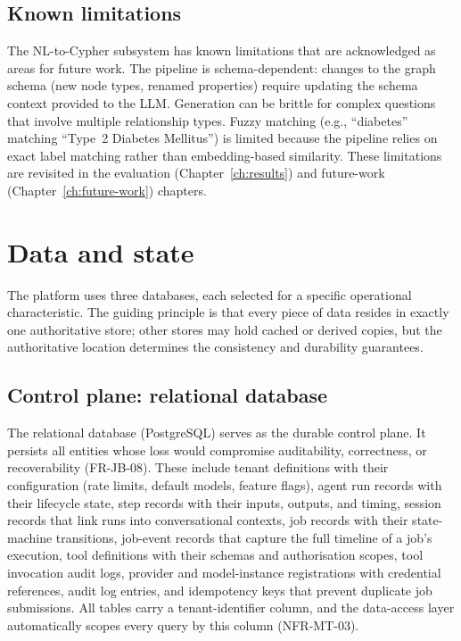 \documentclass[a4paper]{sapthesis}
\begin{document}
\subsection{Known limitations}

The NL-to-Cypher subsystem has known limitations that are acknowledged as
areas for future work.  The pipeline is schema-dependent: changes to the
graph schema (new node types, renamed properties) require updating the
schema context provided to the LLM.  Generation can be brittle for complex
questions that involve multiple relationship types.  Fuzzy matching (e.g.,
``diabetes'' matching ``Type~2 Diabetes Mellitus'') is limited because the
pipeline relies on exact label matching rather than embedding-based
similarity.  These limitations are revisited in the evaluation
(Chapter~\ref{ch:results}) and future-work (Chapter~\ref{ch:future-work})
chapters.


\section{Data and state}
\label{sec:data-state}

The platform uses three databases, each selected for a specific
operational characteristic.  The guiding principle is that every
piece of data resides in exactly one authoritative store; other stores may
hold cached or derived copies, but the authoritative location determines
the consistency and durability guarantees.

\subsection{Control plane: relational database}

The relational database (PostgreSQL) serves as the durable control plane.
It persists all entities whose loss would compromise auditability,
correctness, or recoverability (FR-JB-08).  These include tenant
definitions with their configuration (rate limits, default models, feature
flags), agent run records with their lifecycle state, step records with
their inputs, outputs, and timing, session records that link runs into
conversational contexts, job records with their state-machine transitions,
job-event records that capture the full timeline of a job's execution,
tool definitions with their schemas and authorisation scopes, tool
invocation audit logs, provider and model-instance registrations with
credential references, audit log entries, and idempotency keys that
prevent duplicate job submissions.  All tables carry a tenant-identifier
column, and the data-access layer automatically scopes every query by
this column (NFR-MT-03).
\end{document}
